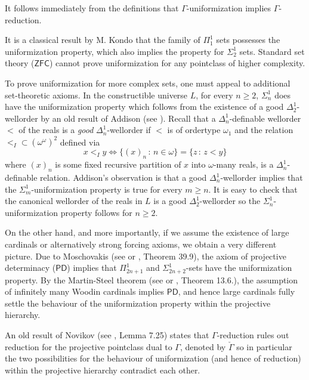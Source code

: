\documentclass[a4paper,11pt]{article}
\newcommand{\PD}{\mathsf{PD}}
\begin{document}
It follows immediately from the definitions that $\Gamma$-uniformization implies ${\Gamma}$-reduction.




It is a classical result by M. Kondo that the family of $\Pi^1_1$ sets  possesses the uniformization property, which also implies the property for $\Sigma^1_2$ sets. Standard set theory ($\mathsf{ZFC}$) cannot prove uniformization for any pointclass of higher complexity.


To prove uniformization for more complex sets, one must appeal to additional set-theoretic axioms. In the constructible universe $L$, for every $n \ge 2$, $\Sigma^1_{n}$ does have the uniformization property which follows from the existence of a good $\Delta^1_2$-wellorder by an old result of Addison (see \cite{Addison}). Recall that a $\Delta^1_n$-definable wellorder $<$ of the reals is a \emph{good} $\Delta^1_n$-wellorder if $<$ is of ordertype $\omega_1$ and the relation $<_{I} \subset (\omega^{\omega})^2$ defined via
\[ x <_I y \Leftrightarrow \{(x)_n \, : \, n \in \omega\}= \{z \, : \, z < y\} \]
where $(x)_n$ is some fixed recursive partition of $x$ into $\omega$-many reals, is a $\Delta^1_n$-definable relation. Addison's observation is that a good $\Delta^1_n$-wellorder implies that the $\Sigma^1_m$-uniformization property is true for every $m \ge n$. It is easy to check that the canonical wellorder of the reals in $L$ is a good $\Delta^1_2$-wellorder so the $\Sigma^1_n$-uniformization property follows for $n \ge 2$. 


On the other hand, and more importantly, if we assume the existence of large cardinals or alternatively strong forcing axioms, we obtain a very different picture.
Due to Moschovakis (see \cite{Moschovakis2} or \cite{Kechris}, Theorem 39.9), the axiom of projective determinacy ($\PD$) implies that $\Pi^1_{2n+1}$ and $\Sigma^1_{2n+2}$-sets have the uniformization property. By the Martin-Steel theorem (see \cite{MS} or \cite{Schindler}, Theorem 13.6.), the assumption of infinitely many Woodin cardinals implies $\PD$, and hence large cardinals fully settle the behaviour of the uniformization property within the projective hierarchy.


An old result of Novikov (see \cite{Schindler}, Lemma 7.25) states that $\Gamma$-reduction rules out reduction for the projective pointclass dual to $\Gamma$, denoted by $\check{\Gamma}$ so in particular the two possibilities for the behaviour of uniformization (and hence of reduction) within the projective hierarchy contradict each other.
\end{document}
